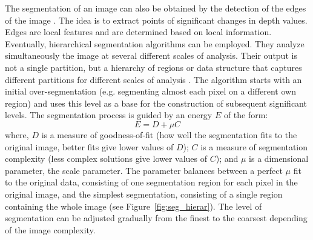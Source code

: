 The segmentation of an image can also be obtained by the detection of the edges of the image \citep{peli1982study}. The idea is to extract points of significant changes in depth values. Edges are local features and are determined based on local information. \\

Eventually, hierarchical segmentation algorithms can be employed. They analyze simultaneously the image at several different scales of analysis. Their output is not a single partition, but a hierarchy of regions or data structure that captures different partitions for different scales of analysis \citep{trias2006semi, guigues2006scale, baatz2004method}. The algorithm starts with an initial over-segmentation (e.g. segmenting almost each pixel on a different own region) and uses this level as a base for the construction of subsequent significant levels. The segmentation process is guided by an energy $E$ of the form:
\begin{equation}
E = D + \mu C
\end{equation}
where, $D$ is a measure of goodness-of-fit (how well the segmentation fits to the original image, better fits give lower values of $D$); $C$ is a measure of segmentation complexity (less complex solutions give lower values of $C$); and $\mu$ is a dimensional parameter, the scale parameter. The parameter balances between a perfect $\mu$ fit to the original data, consisting of one segmentation region for each pixel in the original image, and the simplest segmentation, consisting of a single region containing the whole image \citep{guigues2006scale} (see Figure~\ref{fig:seg_hierar}). The level of segmentation can be adjusted gradually from the finest to the coarsest depending of the image complexity.


